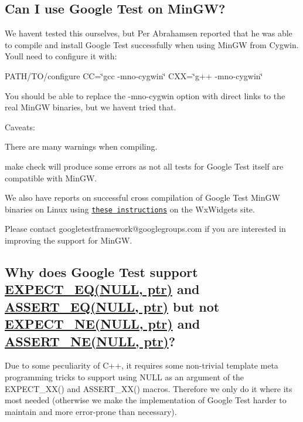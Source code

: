 \subsection*{Can I use Google Test on Min\+GW?}

We haven\textquotesingle{}t tested this ourselves, but Per Abrahamsen reported that he was able to compile and install Google Test successfully when using Min\+GW from Cygwin. You\textquotesingle{}ll need to configure it with\+:

{\ttfamily P\+A\+T\+H/\+T\+O/configure CC=\char`\"{}gcc -\/mno-\/cygwin\char`\"{} C\+XX=\char`\"{}g++ -\/mno-\/cygwin\char`\"{}}

You should be able to replace the {\ttfamily -\/mno-\/cygwin} option with direct links to the real Min\+GW binaries, but we haven\textquotesingle{}t tried that.

Caveats\+:


\begin{DoxyItemize}
\item There are many warnings when compiling.
\item {\ttfamily make check} will produce some errors as not all tests for Google Test itself are compatible with Min\+GW.
\end{DoxyItemize}

We also have reports on successful cross compilation of Google Test Min\+GW binaries on Linux using \href{http://wiki.wxwidgets.org/Cross-Compiling_Under_Linux#Cross-compiling_under_Linux_for_MS_Windows}{\tt these instructions} on the Wx\+Widgets site.

Please contact {\ttfamily googletestframework@googlegroups.\+com} if you are interested in improving the support for Min\+GW.

\subsection*{Why does Google Test support \hyperlink{gtest_8h_a4159019abda84f5366acdb7604ff220a}{E\+X\+P\+E\+C\+T\+\_\+\+E\+Q(\+N\+U\+L\+L, ptr)} and \hyperlink{gtest_8h_a1a6db8b1338ee7040329322b77779086}{A\+S\+S\+E\+R\+T\+\_\+\+E\+Q(\+N\+U\+L\+L, ptr)} but not \hyperlink{gtest_8h_a6ae7443947f25abc58bfcfcfc56b0d75}{E\+X\+P\+E\+C\+T\+\_\+\+N\+E(\+N\+U\+L\+L, ptr)} and \hyperlink{gtest_8h_aa866c8dece57912e6f51495ed3e8d8d5}{A\+S\+S\+E\+R\+T\+\_\+\+N\+E(\+N\+U\+L\+L, ptr)}?}

Due to some peculiarity of C++, it requires some non-\/trivial template meta programming tricks to support using {\ttfamily N\+U\+LL} as an argument of the {\ttfamily E\+X\+P\+E\+C\+T\+\_\+\+X\+X()} and {\ttfamily A\+S\+S\+E\+R\+T\+\_\+\+X\+X()} macros. Therefore we only do it where it\textquotesingle{}s most needed (otherwise we make the implementation of Google Test harder to maintain and more error-\/prone than necessary).

